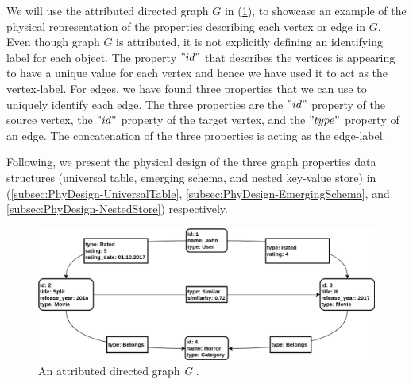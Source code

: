 {We will use the attributed directed graph $G$ in (\ref{fig:PropertyGraph_physical}), to showcase an example of the physical representation of the properties describing each vertex or edge in $G$. Even though graph $G$ is attributed, it is not explicitly defining an identifying label for each object. The property $"id"$ that describes the vertices is appearing to have a unique value for each vertex and hence we have used it to act as the vertex-label. For edges, we have found three properties that we can use to uniquely identify each edge. The three properties are the $"id"$ property of the source vertex, the $"id"$ property of the target vertex, and the $"type"$ property of an edge. The concatenation of the three properties is acting as the edge-label.

Following, we present the physical design of the three graph properties data structures (universal table, emerging schema, and nested key-value store) in (\ref{subsec:PhyDesign-UniversalTable}, \ref{subsec:PhyDesign-EmergingSchema}, and \ref{subsec:PhyDesign-NestedStore}) respectively.




\begin{figure}[H]
\centering
\includegraphics[width=1\textwidth]{pics/PropertyGraph.png}
\caption{An attributed directed graph \textit{G} \cite{DBLP:journals/corr/ParadiesLB14}.}
\label{fig:PropertyGraph_physical}
\end{figure} 







}
